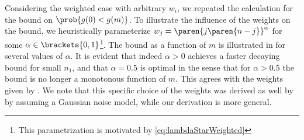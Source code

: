 Considering the weighted case with arbitrary $w_i$, we repeated the calculation for the bound on
$\prob{g(0)<g(m)}$.
To illustrate the influence of the weights on the bound, we heuristically parameterize $w_j=\paren{j\paren{n-j}}^\alpha$ for some $\alpha\in\brackets{0,1}$\footnote{This parametrization is motivated by \eqref{eq:lambdaStarWeighted}}.
The bound as a function of $m$ is illustrated in  for several values of $\alpha$.
It is evident that indeed $\alpha>0$ achieves a faster decaying bound for small $n_1$, and that $\alpha=0.5$ is optimal in the sense that for $\alpha>0.5$ the bound is no longer a monotonous function of $m$. This agrees with the weights given by . We note that this specific choice of the weights was derived as well by \cite{bleakley2011group} by assuming a Gaussian noise model, while our derivation is more general.
